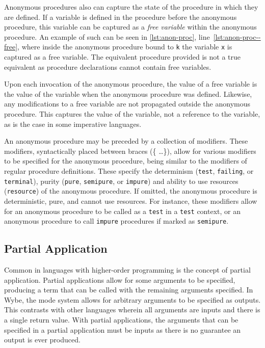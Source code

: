 Anonymous procedures also can capture the state of the procedure in which they are defined. If a variable is defined in the procedure before the anonymous procedure, this variable can be captured as a \textit{free variable} within the anonymous procedure. An example of such can be seen in \cref{lst:anon-proc}, line~\ref{lst:anon-proc--free}, where inside the anonymous procedure bound to \texttt{k} the variable \texttt{x} is captured as a free variable. The equivalent procedure provided is not a true equivalent as procedure declarations cannot contain free variables. 

Upon each invocation of the anonymous procedure, the value of a free variable is the value of the variable when the anonymous procedure was defined. Likewise, any modifications to a free variable are not propagated outside the anonymous procedure. This captures the value of the variable, not a reference to the variable, as is the case in some imperative languages. 

An anonymous procedure may be preceded by a collection of modifiers. These modifiers, syntactically placed between braces (\{ \dots \}), allow for various modifiers to be specified for the anonymous procedure, being similar to the modifiers of regular procedure definitions. These specify the determinism (\texttt{test}, \texttt{failing}, or \texttt{terminal}), purity (\texttt{pure}, \texttt{semipure}, or \texttt{impure}) and ability to use resources (\texttt{resource}) of the anonymous procedure. If omitted, the anonymous procedure is deterministic, pure, and cannot use resources. For instance, these modifiers allow for an anonymous procedure to be called as a \texttt{test} in a \texttt{test} context, or an anonymous procedure to call \texttt{impure} procedures if marked as \texttt{semipure}.

\subsection{Partial Application}
\label{ssec:ss-partial-application}

Common in languages with higher-order programming is the concept of partial application. Partial applications allow for some arguments to be specified, producing a term that can be called with the remaining arguments specified. In Wybe, the mode system allows for arbitrary arguments to be specified as outputs. This contrasts with other languages wherein all arguments are inputs and there is a single return value. With partial applications, the arguments that can be specified in a partial application must be inputs as there is no guarantee an output is ever produced. 

